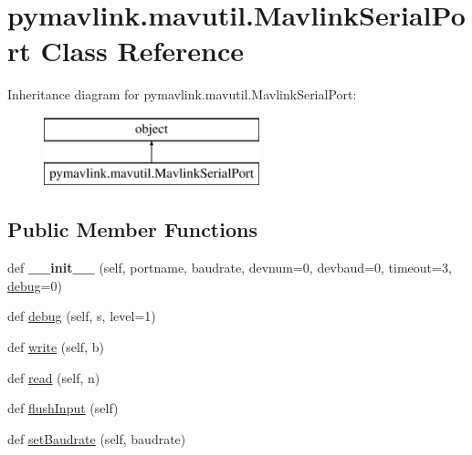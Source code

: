 \hypertarget{classpymavlink_1_1mavutil_1_1MavlinkSerialPort}{}\section{pymavlink.\+mavutil.\+Mavlink\+Serial\+Port Class Reference}
\label{classpymavlink_1_1mavutil_1_1MavlinkSerialPort}
Inheritance diagram for pymavlink.\+mavutil.\+Mavlink\+Serial\+Port\+:\begin{figure}[H]
\begin{center}
\leavevmode
\includegraphics[height=2.000000cm]{classpymavlink_1_1mavutil_1_1MavlinkSerialPort}
\end{center}
\end{figure}
\subsection*{Public Member Functions}
\begin{DoxyCompactItemize}
\item 
\mbox{\label{classpymavlink_1_1mavutil_1_1MavlinkSerialPort_ab3d1f1a5a2d3f30628aa6b2e5c8822f0}} 
def {\bfseries \+\_\+\+\_\+init\+\_\+\+\_\+} (self, portname, baudrate, devnum=0, devbaud=0, timeout=3, \hyperlink{classpymavlink_1_1mavutil_1_1MavlinkSerialPort_a1eb7dbf7a42f76566838ef6552789fcc}{debug}=0)
\item 
def \hyperlink{classpymavlink_1_1mavutil_1_1MavlinkSerialPort_a1eb7dbf7a42f76566838ef6552789fcc}{debug} (self, s, level=1)
\item 
def \hyperlink{classpymavlink_1_1mavutil_1_1MavlinkSerialPort_a8e93f398163539282b8e7b8e1d0e1d94}{write} (self, b)
\item 
def \hyperlink{classpymavlink_1_1mavutil_1_1MavlinkSerialPort_a283f7df07e665e8dfdc627c02872aa6d}{read} (self, n)
\item 
def \hyperlink{classpymavlink_1_1mavutil_1_1MavlinkSerialPort_a88334caabef6a1866bef8601a6b84cf9}{flush\+Input} (self)
\item 
def \hyperlink{classpymavlink_1_1mavutil_1_1MavlinkSerialPort_afdfd22c496aad11500d159499a5c15e0}{set\+Baudrate} (self, baudrate)
\end{DoxyCompactItemize}
